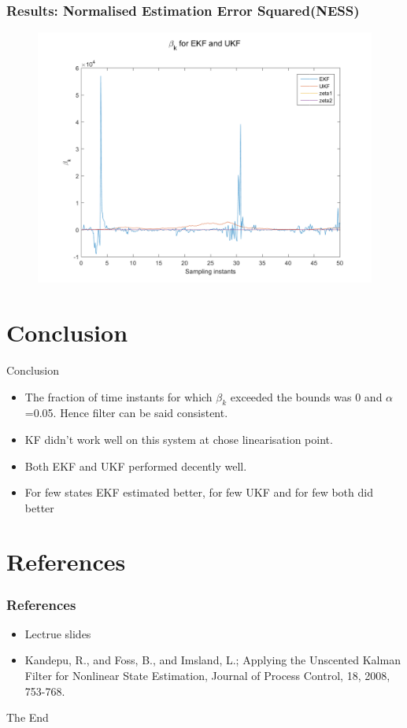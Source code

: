 \documentclass{beamer}
\begin{document}
\begin{frame}
\frametitle{Results: Normalised Estimation Error Squared(NESS)}
\begin{figure}
\includegraphics[width=0.8\linewidth]{betak_noKF.png}
\end{figure}
\end{frame}
\section{Conclusion}
\begin{frame}{Conclusion}
    \begin{itemize}
        \item The fraction of time instants for which $\beta_k$ exceeded the bounds was 0 and $\alpha$=0.05. Hence filter can be said consistent.
        \item KF didn't work well on this system at chose linearisation point.
        \item Both EKF and UKF performed decently well.
        \item For few states EKF estimated better, for few UKF and for few both did better
    \end{itemize}
\end{frame}
\section{References}
\begin{frame}
\frametitle{References}
\begin{itemize}
    \item Lectrue slides
    \item Kandepu, R., and Foss, B., and Imsland, L.; Applying the Unscented Kalman Filter
for Nonlinear State Estimation, Journal of Process Control, 18, 2008, 753-768.
\end{itemize}
\end{frame}


\begin{frame}
\Huge{\centerline{The End}}
\end{frame}
\end{document}
